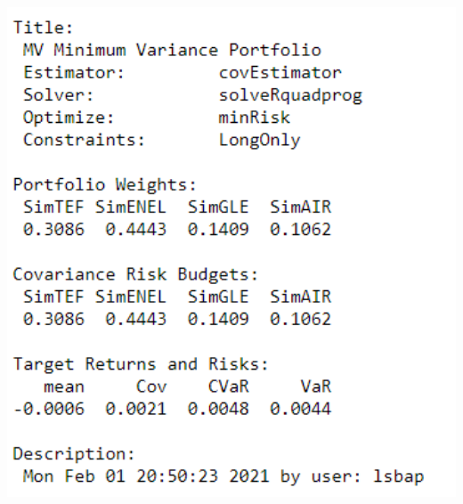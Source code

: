 \documentclass[
  12pt,
  a4paper,
  openany]{book}
\begin{document}
\begin{center}
\begin{minipage}{0.90\linewidth}
    \centering
    \includegraphics[width=2\textwidth]{image/vi.png}
\end{minipage}
\end{center}
\end{document}
